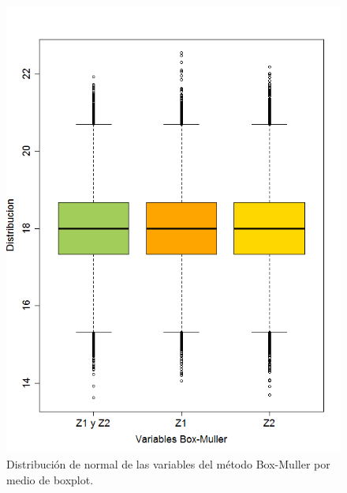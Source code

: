 \documentclass[]{article}
\begin{document}
\begin{figure}[b]
    \centering
    \includegraphics[width=.5\linewidth]{BoxplotVariables.png}    \caption{Distribución de normal de las variables del método Box-Muller por medio de boxplot.}
    \label{fig:boxplot}
\end{figure}
\end{document}
